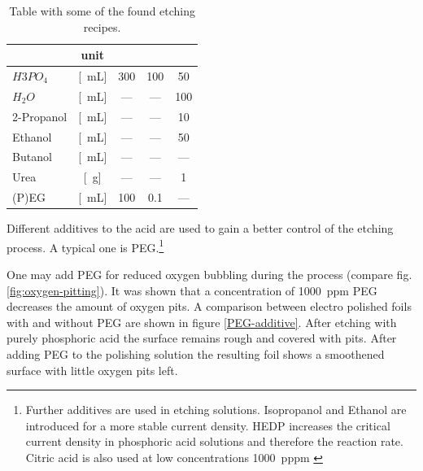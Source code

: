 \begin{table}[] \centering
	\caption{Table with some of the found etching recipes.}
	\begin{tabular}{lcccc}
		& unit 			& \cite{luo_effect_2011} & \cite{stables_report_2008} & \cite{bin_zhang_low-temperature_2012} \\ \hline 
		$H3PO_4$	&[\SI{}{\milli\liter}]  & 300   & 100	& 50 \\
		$H_2O$		&[\SI{}{\milli\liter}]	& ---	& ---	& 100 \\
		2-Propanol	&[\SI{}{\milli\liter}]	& ---	& ---	&  10 \\
		Ethanol		&[\SI{}{\milli\liter}]	& ---	& ---	&  50 \\
		Butanol		&[\SI{}{\milli\liter}]	& ---	& ---	& --- \\
		Urea		&[\SI{}{\gram}]		    & ---   & ---	& 1 \\
		(P)EG		&[\SI{}{\milli\liter}] 	& 100	& 0.1  	& --- \\
	\end{tabular}
	\label{tab:etching-recipes}
\end{table}
Different additives to the acid are used to gain a better control of the etching process.  A typical one is PEG.\footnote{Further additives are used in etching solutions. Isopropanol and Ethanol are introduced for a more stable current density. HEDP increases the critical current density in phosphoric acid solutions\cite{jinshan_electrochemical_2004} and therefore the reaction rate. Citric acid is also used at low concentrations \SI{1000}{pppm} \cite{chang_superpolishing_2003}}  

One may add PEG for reduced oxygen bubbling during the process (compare fig. \ref{fig:oxygen-pitting})\cite{stables_report_2008,chang_superpolishing_2003}. It was shown that a concentration of \SI{1000}{ppm} PEG decreases the amount of oxygen pits. A comparison between electro polished foils with and without PEG are shown in figure \ref{PEG-additive}. After etching with purely phosphoric acid the surface remains rough and covered with pits. After adding PEG to the polishing solution the resulting foil shows a smoothened surface with little oxygen pits left.

